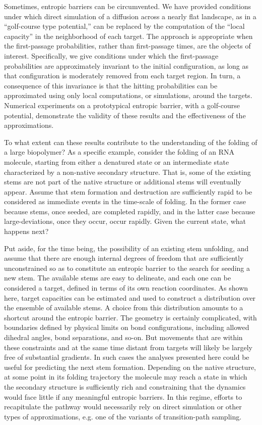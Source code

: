 \documentclass[nofootinbib,english, aip, jcp, priprint, graphicx,floatfix]{revtex4-1}
\theoremstyle{plain}
\theoremstyle{definition}
\theoremstyle{plain}
\begin{document}
Sometimes, entropic barriers can be circumvented. We have provided conditions under which direct simulation of a diffusion across a nearly flat landscape, as in a ``golf-course type potential,'' can be 
replaced by the computation of the ``local capacity'' in the neighborhood of each target. The approach is appropriate when the first-passage probabilities, rather than first-passage times, are the objects of interest. Specifically, we give conditions 
under which the first-passage probabilities are approximately invariant to the initial configuration, as long as that configuration is moderately removed from each target region. In turn, a consequence of this invariance is that the hitting probabilities can be approximated using only local computations, or simulations, around the targets.  Numerical experiments on a prototypical entropic barrier, with a golf-course potential, demonstrate the validity of these results and the effectiveness of the approximations.

To what extent can these results contribute to the understanding of the folding of a large biopolymer? As a specific example, consider the folding of an RNA molecule, starting from either a denatured state or an intermediate state characterized by a non-native secondary structure. That is, some of the existing stems are not part of the native structure or additional stems will eventually appear. Assume that stem formation and destruction are sufficiently rapid to be considered as immediate events in the time-scale of folding. In the former case because stems, once seeded, are completed 
rapidly\cite{Porschke1977-xz}, and in the latter case because large-deviations, once they occur, occur rapidly. 
Given the current state, what happens next? 

Put aside, for the time being, the possibility of an existing stem unfolding, and assume that there are enough internal degrees of freedom that are sufficiently unconstrained so as to constitute an entropic barrier to the search for seeding a new stem. The available stems are easy to delineate, and each one can be considered a target, defined in terms of its own reaction coordinates. As shown here, target capacities can be estimated and used to construct a distribution over the ensemble of available stems. A choice from this distribution amounts to a shortcut around the entropic barrier. The geometry is certainly complicated, with boundaries defined by physical limits on bond configurations, including allowed dihedral angles, bond separations, and so-on. But movements that are within these constraints and at the same time distant from targets will likely be largely free of substantial gradients. In such cases the analyses presented here could be useful for predicting the next stem formation. 
Depending on the native structure, at some point in its folding trajectory the molecule may reach a state in which the secondary structure is sufficiently rich and constraining that the dynamics would face
little if any meaningful entropic barriers. In this regime, efforts to recapitulate the pathway would necessarily rely on direct simulation or other types of approximations, e.g. one of the variants of transition-path sampling.
\end{document}
